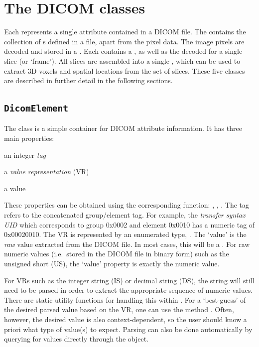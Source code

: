 \section{The DICOM classes}

Each  represents a single attribute contained in a DICOM file.
The  contains the collection of s defined in a file, 
apart from the pixel data.  The image pixels are decoded and stored in a .  
Each  contains a , as well as
the decoded  for a single slice (or `frame').  All slices are assembled into a single 
, which can be used to extract 3D voxels and spatial locations from the set of slices.  
These five classes are described in further detail in the following sections.

\subsection{\texttt{DicomElement}}

The  class is a simple container for DICOM attribute information.  It has
three main properties:
\begin{tightemize}
\item an integer \emph{tag}
\item a \emph{value representation} (VR)
\item a value
\end{tightemize}
These properties can be obtained using the corresponding  function: , , .  The tag refers to the concatenated group/element tag. For example, the \emph{transfer syntax UID} which corresponds to group 0x0002 and element 0x0010 has a numeric tag of 0x00020010. The VR is represented by an enumerated type, .  The `value' is the \emph{raw} value extracted from the DICOM file.  In most cases, this will be a .  For raw numeric values (i.e.~stored in the DICOM file in binary form) such as the unsigned short (US), the `value' property is exactly the numeric value.

For VRs such as the integer string (IS) or decimal string (DS), the string will still need to be parsed in order to extract the appropriate sequence of numeric values.  There are static utility functions for handling this within .  For a `best-guess' of the desired parsed value based on the VR, one can use the method .  Often, however, the desired value is also context-dependent, so the user should know a priori what type of value(s) to expect.  Parsing can also be done automatically by querying for values directly through the  object.  


